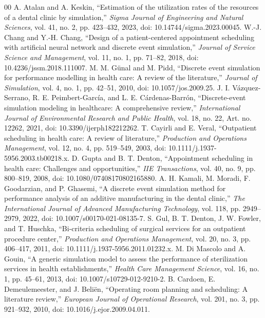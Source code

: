 \documentclass[conference]{IEEEtran}
\begin{document}
\enlargethispage{1pt}
\begin{thebibliography}{00}
 A. Atalan and A. Keskin, ``Estimation of the utilization rates of the resources of a dental clinic by simulation,'' \textit{Sigma Journal of Engineering and Natural Sciences}, vol. 41, no. 2, pp. 423--432, 2023, doi: 10.14744/sigma.2023.00045.
 W.-J. Chang and Y.-H. Chang, ``Design of a patient-centered appointment scheduling with artificial neural network and discrete event simulation,'' \textit{Journal of Service Science and Management}, vol. 11, no. 1, pp. 71--82, 2018, doi: 10.4236/jssm.2018.111007.
 M. M. G\"unal and M. Pidd, ``Discrete event simulation for performance modelling in health care: A review of the literature,'' \textit{Journal of Simulation}, vol. 4, no. 1, pp. 42--51, 2010, doi: 10.1057/jos.2009.25.
 J. I. V\'azquez-Serrano, R. E. Peimbert-Garc\'ia, and L. E. C\'ardenas-Barr\'on, ``Discrete-event simulation modeling in healthcare: A comprehensive review,'' \textit{International Journal of Environmental Research and Public Health}, vol. 18, no. 22, Art. no. 12262, 2021, doi: 10.3390/ijerph182212262.
 T. Cayirli and E. Veral, ``Outpatient scheduling in health care: A review of literature,'' \textit{Production and Operations Management}, vol. 12, no. 4, pp. 519--549, 2003, doi: 10.1111/j.1937-5956.2003.tb00218.x.
 D. Gupta and B. T. Denton, ``Appointment scheduling in health care: Challenges and opportunities,'' \textit{IIE Transactions}, vol. 40, no. 9, pp. 800--819, 2008, doi: 10.1080/07408170802165880.
 A. H. Kamali, M. Moradi, F. Goodarzian, and P. Ghasemi, ``A discrete event simulation method for performance analysis of an additive manufacturing in the dental clinic,'' \textit{The International Journal of Advanced Manufacturing Technology}, vol. 118, pp. 2949--2979, 2022, doi: 10.1007/s00170-021-08135-7.
 S. Gul, B. T. Denton, J. W. Fowler, and T. Huschka, ``Bi-criteria scheduling of surgical services for an outpatient procedure center,'' \textit{Production and Operations Management}, vol. 20, no. 3, pp. 406--417, 2011, doi: 10.1111/j.1937-5956.2011.01232.x.
 M. Di Mascolo and A. Gouin, ``A generic simulation model to assess the performance of sterilization services in health establishments,'' \textit{Health Care Management Science}, vol. 16, no. 1, pp. 45--61, 2013, doi: 10.1007/s10729-012-9210-2.
 B. Cardoen, E. Demeulemeester, and J. Beli\"en, ``Operating room planning and scheduling: A literature review,'' \textit{European Journal of Operational Research}, vol. 201, no. 3, pp. 921--932, 2010, doi: 10.1016/j.ejor.2009.04.011.

\end{thebibliography}
\end{document}
